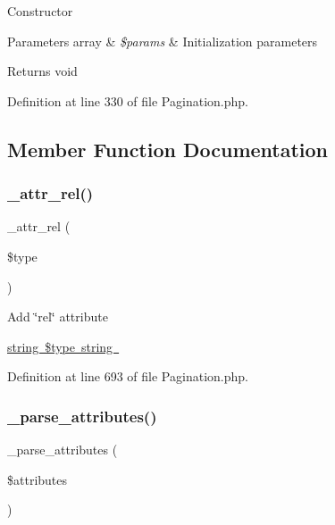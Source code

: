 Constructor


\begin{DoxyParams}[1]{Parameters}
array & {\em \$params} & Initialization parameters \\
\hline
\end{DoxyParams}
\begin{DoxyReturn}{Returns}
void 
\end{DoxyReturn}


Definition at line 330 of file Pagination.\+php.



\subsection{Member Function Documentation}
\mbox{\label{class_c_i___pagination_a0ebda639ff890a52b36ca5eaf27275c0}} 
\subsubsection{\texorpdfstring{\_attr\_rel()}{\_attr\_rel()}}
{\footnotesize\ttfamily \+\_\+attr\+\_\+rel (\begin{DoxyParamCaption}\item[{}]{\$type }\end{DoxyParamCaption})\hspace{0.3cm}{\ttfamily [protected]}}

Add \char`\"{}rel\char`\"{} attribute

\mbox{\hyperlink{}{string \$type  string }}

Definition at line 693 of file Pagination.\+php.

\mbox{\label{class_c_i___pagination_ac8d823533e1a045a789a197373fedf0b}} 
\subsubsection{\texorpdfstring{\_parse\_attributes()}{\_parse\_attributes()}}
{\footnotesize\ttfamily \+\_\+parse\+\_\+attributes (\begin{DoxyParamCaption}\item[{}]{\$attributes }\end{DoxyParamCaption})\hspace{0.3cm}{\ttfamily [protected]}}

